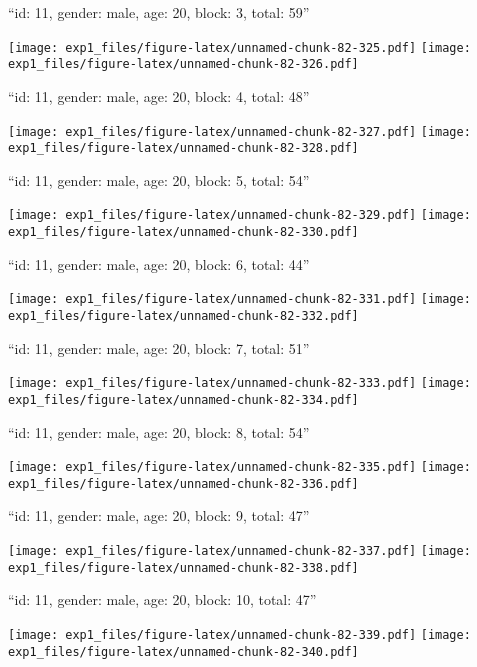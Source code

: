 \documentclass[11pt,,]{article}
\begin{document}
\newpage
[1] 

``id: 11, gender: male, age: 20, block: 3, total: 59''

\texttt{[image: exp1\_files/figure-latex/unnamed-chunk-82-325.pdf]}
\texttt{[image: exp1\_files/figure-latex/unnamed-chunk-82-326.pdf]}

\newpage
[1] 

``id: 11, gender: male, age: 20, block: 4, total: 48''

\texttt{[image: exp1\_files/figure-latex/unnamed-chunk-82-327.pdf]}
\texttt{[image: exp1\_files/figure-latex/unnamed-chunk-82-328.pdf]}

\newpage
[1] 

``id: 11, gender: male, age: 20, block: 5, total: 54''

\texttt{[image: exp1\_files/figure-latex/unnamed-chunk-82-329.pdf]}
\texttt{[image: exp1\_files/figure-latex/unnamed-chunk-82-330.pdf]}

\newpage
[1] 

``id: 11, gender: male, age: 20, block: 6, total: 44''

\texttt{[image: exp1\_files/figure-latex/unnamed-chunk-82-331.pdf]}
\texttt{[image: exp1\_files/figure-latex/unnamed-chunk-82-332.pdf]}

\newpage
[1] 

``id: 11, gender: male, age: 20, block: 7, total: 51''

\texttt{[image: exp1\_files/figure-latex/unnamed-chunk-82-333.pdf]}
\texttt{[image: exp1\_files/figure-latex/unnamed-chunk-82-334.pdf]}

\newpage
[1] 

``id: 11, gender: male, age: 20, block: 8, total: 54''

\texttt{[image: exp1\_files/figure-latex/unnamed-chunk-82-335.pdf]}
\texttt{[image: exp1\_files/figure-latex/unnamed-chunk-82-336.pdf]}

\newpage
[1] 

``id: 11, gender: male, age: 20, block: 9, total: 47''

\texttt{[image: exp1\_files/figure-latex/unnamed-chunk-82-337.pdf]}
\texttt{[image: exp1\_files/figure-latex/unnamed-chunk-82-338.pdf]}

\newpage
[1] 

``id: 11, gender: male, age: 20, block: 10, total: 47''

\texttt{[image: exp1\_files/figure-latex/unnamed-chunk-82-339.pdf]}
\texttt{[image: exp1\_files/figure-latex/unnamed-chunk-82-340.pdf]}
\end{document}
